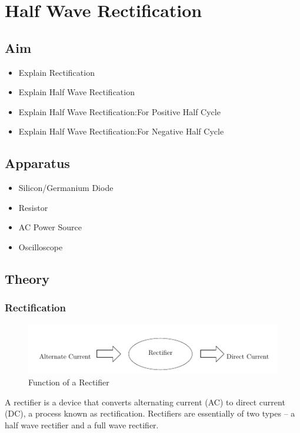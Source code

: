 \chapter{Half Wave Rectification}
	\section{Aim}
		\begin{itemize}
			\tightlist
			\item Explain Rectification
			\item Explain Half Wave Rectification
			\item Explain Half Wave Rectification:For Positive Half Cycle
			\item Explain Half Wave Rectification:For Negative Half Cycle
		\end{itemize}

	\section{Apparatus}
		\begin{itemize}
			\tightlist
			\item Silicon/Germanium Diode
			\item Resistor
			\item AC Power Source
			\item Oscilloscope
		\end{itemize}
	
	\section{Theory}
		\subsection{Rectification}
			\begin{figure}[h]
				\centering
				\includegraphics[width=0.9\linewidth]{img/exp6/1}
				\caption{Function of a Rectifier}
				\label{fig:rffxn}
			\end{figure}
			A rectifier is a device that converts alternating current (AC) to direct current (DC), a process known as rectification. Rectifiers are essentially of two types – a half wave rectifier and a full wave rectifier.
			
